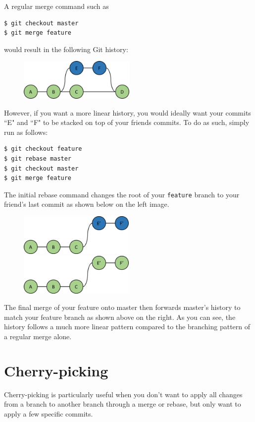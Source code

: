 \documentclass{amsart}
\begin{document}
A regular merge command such as
\begin{verbatim}
$ git checkout master
$ git merge feature
\end{verbatim}
would result in the following Git history:
\begin{figure}[h]
\center
\includegraphics[height=2cm]{merge}
\end{figure}

However, if you want a more linear history, you would ideally want your commits ``E" and ``F" to be stacked on top of your friends commits.  To do as such, simply run as follows:
\begin{verbatim}
$ git checkout feature
$ git rebase master
$ git checkout master
$ git merge feature
\end{verbatim}

The initial rebase command changes the root of your \texttt{feature} branch to your friend's last commit as shown below on the left image.

\begin{figure}[h]
\center
\includegraphics[height=2cm]{rebase}
\includegraphics[height=2cm]{rebase_merge}
\end{figure}

The final merge of your feature onto master then forwards master's history to match your feature branch as shown above on the right.  As you can see, the history follows a much more linear pattern compared to the branching pattern of a regular merge alone.

\newpage
\section*{Cherry-picking}

Cherry-picking is particularly useful when you don't want to apply all changes from a branch to another branch through a merge or rebase, but only want to apply a few specific commits.
\end{document}
